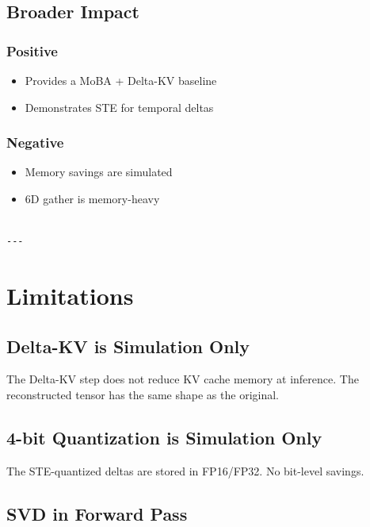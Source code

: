 \subsection{Broader Impact}

\subsubsection{Positive}
\begin{itemize}
\item Provides a MoBA + Delta-KV baseline
\item Demonstrates STE for temporal deltas

\end{itemize}
\subsubsection{Negative}
\begin{itemize}
\item Memory savings are simulated
\item 6D gather is memory-heavy
\end{itemize}
\begin{lstlisting}

---
\end{lstlisting}

\section{Limitations}

\subsection{Delta-KV is Simulation Only}

The Delta-KV step does not reduce KV cache memory at inference. The 
reconstructed tensor has the same shape as the original.

\subsection{4-bit Quantization is Simulation Only}

The STE-quantized deltas are stored in FP16/FP32. No bit-level savings.

\subsection{SVD in Forward Pass}

